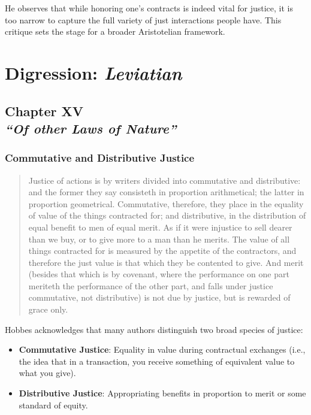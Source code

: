             \begin{remark}
                He observes that while honoring one’s contracts is indeed vital for justice, it is too narrow to capture the full variety of just interactions people have. This critique sets the stage for a broader Aristotelian framework.
            \end{remark}

\section{Digression: \textit{Leviatian}}

    \subsection[Of other Laws of Nature]{Chapter XV\\
                \textit{“Of other Laws of Nature”}}

        \subsubsection{Commutative and Distributive Justice}

            \begin{quote}
                Justice of actions is by writers divided into commutative and distributive: and the former they say consisteth in proportion arithmetical; the latter in proportion geometrical. Commutative, therefore, they place in the equality of value of the things contracted for; and distributive, in the distribution of equal benefit to men of equal merit. As if it were injustice to sell dearer than we buy, or to give more to a man than he merits. The value of all things contracted for is measured by the appetite of the contractors, and therefore the just value is that which they be contented to give. And merit (besides that which is by covenant, where the performance on one part meriteth the performance of the other part, and falls under justice commutative, not distributive) is not due by justice, but is rewarded of grace only.
            \end{quote}

            Hobbes acknowledges that many authors distinguish two broad species of justice:

            \begin{itemize}
                \item \textbf{Commutative Justice}: Equality in value during contractual exchanges (i.e., the idea that in a transaction, you receive something of equivalent value to what you give).
                \item \textbf{Distributive Justice}: Appropriating benefits in proportion to merit or some standard of equity.
            \end{itemize}
            
